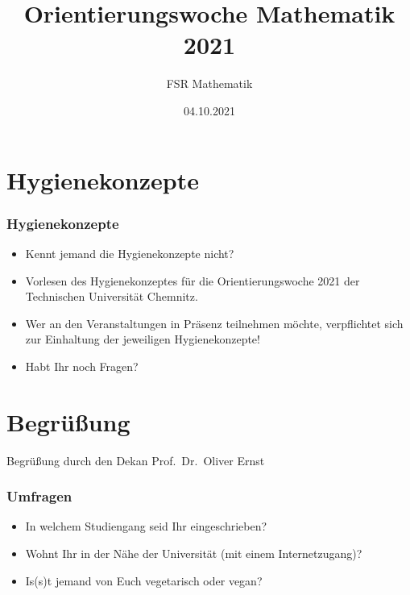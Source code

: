 \documentclass[10pt]{beamer}
\title[Orientierungswoche Mathematik 2021]{Orientierungswoche Mathematik 2021}
\author{FSR Mathematik}
\date{04.10.2021}
\institute[]{TU Chemnitz}
\makeatletter
\newcommand{\highl}[1]{\color{tuccolor@ma}#1\color{black}}
\makeatother
\begin{document}
\begingroup

\tucthreeheadlines


\endgroup

\tuctwoheadlines

\section{Hygienekonzepte}

\begin{frame}
	\frametitle{Hygienekonzepte}

	\begin{itemize}
		\item Kennt jemand die Hygienekonzepte nicht?
		\item Vorlesen des Hygienekonzeptes für die Orientierungswoche 2021 der Technischen Universität Chemnitz.
		\item Wer an den Veranstaltungen in Präsenz teilnehmen möchte, verpflichtet sich zur Einhaltung der jeweiligen Hygienekonzepte!
		\item Habt Ihr noch Fragen?
	\end{itemize}
\end{frame}


\section{Begrüßung}

\begin{frame}
	\begin{center}
		\Huge{\highl{Begrüßung durch den Dekan Prof.~Dr.~Oliver Ernst}}
	\end{center}
\end{frame}

\begin{frame}
	\frametitle{Umfragen}

	\begin{itemize}
		\item In welchem Studiengang seid Ihr eingeschrieben?
		\item Wohnt Ihr in der Nähe der Universität (mit einem Internetzugang)?
		\item Is(s)t jemand von Euch vegetarisch oder vegan?
	\end{itemize}
\end{frame}
\end{document}

